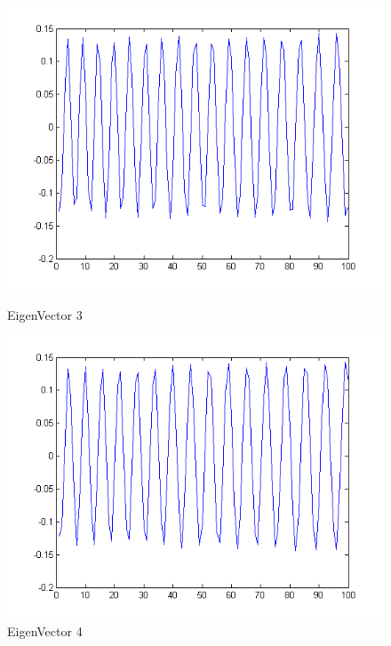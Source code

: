 \documentclass[12pt]{article}
\begin{document}
\begin{figure}[H]
\begin{minipage}[b]{0.5\linewidth}
	\includegraphics[scale=.5]{v1p3.png}
	\caption{EigenVector 3}
\end{minipage}
\begin{minipage}[b]{0.5\linewidth}
	\includegraphics[scale=.5]{v1p4.png}
	\caption{EigenVector 4}
\end{minipage}
\end{figure}
\end{document}
